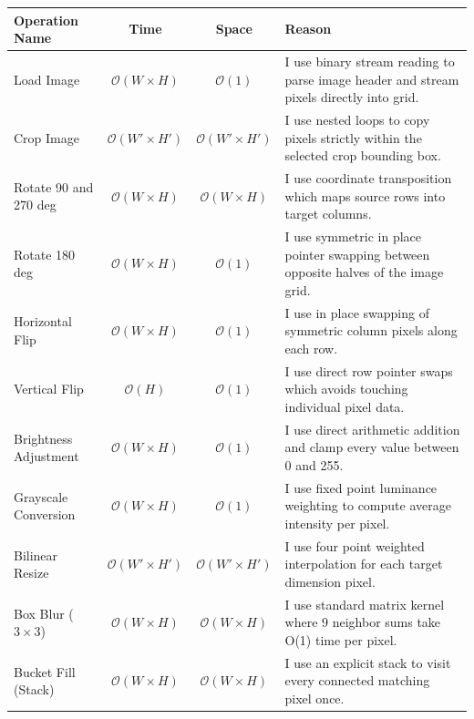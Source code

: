 \documentclass[10pt,a4paper]{article}
\begin{document}
\vspace{0.1cm}
\begin{table}[h!]
\centering
\fontsize{7.5pt}{9.4pt}\selectfont
\begin{tabularx}{\textwidth}{l c c X}
\toprule
\textbf{Operation Name} & \textbf{Time} & \textbf{Space} & \textbf{Reason} \\
\midrule
Load Image & $\mathcal{O}(W \times H)$ & $\mathcal{O}(1)$ & I use binary stream reading to parse image header and stream pixels directly into grid. \\
\addlinespace[1pt]
Crop Image & $\mathcal{O}(W' \times H')$ & $\mathcal{O}(W' \times H')$ & I use nested loops to copy pixels strictly within the selected crop bounding box. \\
\addlinespace[1pt]
Rotate 90 and 270 deg & $\mathcal{O}(W \times H)$ & $\mathcal{O}(W \times H)$ & I use coordinate transposition which maps source rows into target columns. \\
\addlinespace[1pt]
Rotate 180 deg & $\mathcal{O}(W \times H)$ & $\mathcal{O}(1)$ & I use symmetric in place pointer swapping between opposite halves of the image grid. \\
\addlinespace[1pt]
Horizontal Flip & $\mathcal{O}(W \times H)$ & $\mathcal{O}(1)$ & I use in place swapping of symmetric column pixels along each row. \\
\addlinespace[1pt]
Vertical Flip & $\mathcal{O}(H)$ & $\mathcal{O}(1)$ & I use direct row pointer swaps which avoids touching individual pixel data. \\
\addlinespace[1pt]
Brightness Adjustment & $\mathcal{O}(W \times H)$ & $\mathcal{O}(1)$ & I use direct arithmetic addition and clamp every value between 0 and 255. \\
\addlinespace[1pt]
Grayscale Conversion & $\mathcal{O}(W \times H)$ & $\mathcal{O}(1)$ & I use fixed point luminance weighting to compute average intensity per pixel. \\
\addlinespace[1pt]
Bilinear Resize & $\mathcal{O}(W' \times H')$ & $\mathcal{O}(W' \times H')$ & I use four point weighted interpolation for each target dimension pixel. \\
\addlinespace[1pt]
Box Blur ($3 \times 3$) & $\mathcal{O}(W \times H)$ & $\mathcal{O}(W \times H)$ & I use standard matrix kernel where 9 neighbor sums take O(1) time per pixel. \\
\addlinespace[1pt]
Bucket Fill (Stack) & $\mathcal{O}(W \times H)$ & $\mathcal{O}(W \times H)$ & I use an explicit stack to visit every connected matching pixel once. \\

\end{tabularx}
\end{table}
\end{document}
